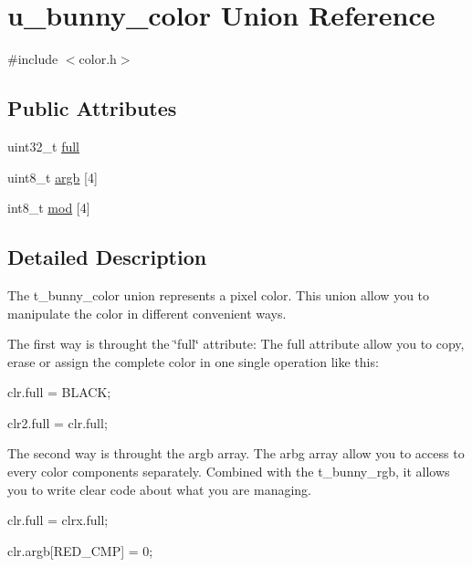 \hypertarget{unionu__bunny__color}{\section{u\-\_\-bunny\-\_\-color Union Reference}
\label{unionu__bunny__color}
}


{\ttfamily \#include $<$color.\-h$>$}

\subsection*{Public Attributes}
\begin{DoxyCompactItemize}
\item 
uint32\-\_\-t \hyperlink{unionu__bunny__color_a4f04c3adea96c3bfed398cdc0661490f}{full}
\item 
uint8\-\_\-t \hyperlink{unionu__bunny__color_a7330b391a73e6d90e8c64ffaaa1315e5}{argb} \mbox{[}4\mbox{]}
\item 
int8\-\_\-t \hyperlink{unionu__bunny__color_a8e82ba841d3953edfff632732c2893b1}{mod} \mbox{[}4\mbox{]}
\end{DoxyCompactItemize}


\subsection{Detailed Description}
The t\-\_\-bunny\-\_\-color union represents a pixel color. This union allow you to manipulate the color in different convenient ways.

The first way is throught the \char`\"{}full\char`\"{} attribute\-: The full attribute allow you to copy, erase or assign the complete color in one single operation like this\-:
\begin{DoxyItemize}
\item clr.\-full = B\-L\-A\-C\-K;
\item clr2.\-full = clr.\-full;
\end{DoxyItemize}

The second way is throught the argb array. The arbg array allow you to access to every color components separately. Combined with the t\-\_\-bunny\-\_\-rgb, it allows you to write clear code about what you are managing.
\begin{DoxyItemize}
\item clr.\-full = clrx.\-full;
\item clr.\-argb\mbox{[}R\-E\-D\-\_\-\-C\-M\-P\mbox{]} = 0;
\end{DoxyItemize}

